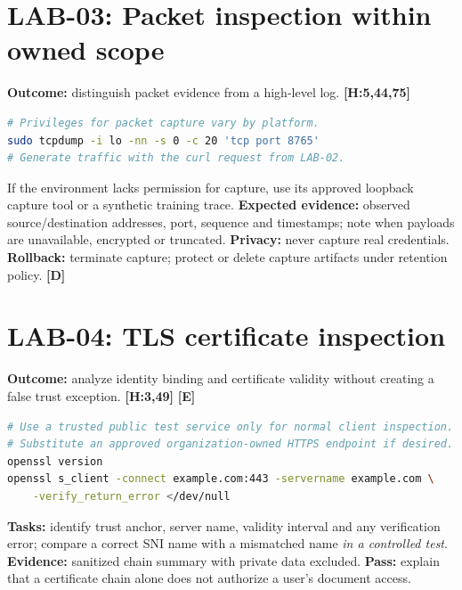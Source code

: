 \documentclass[10pt,letterpaper,oneside]{article}
\newcommand{\handbookref}[1]{\textsf{\color{accent}\textbf{[H:#1]}}}
\newcommand{\modernext}{\textsf{\color{muted}\textbf{[E]}}}
\newcommand{\designed}{\textsf{\color{accent}\textbf{[D]}}}
\begin{document}
\section{LAB-03: Packet inspection within owned scope}
\textbf{Outcome:} distinguish packet evidence from a high-level log. \handbookref{5,44,75}
\begin{lstlisting}[language=bash,caption={Optional local-only capture}]
# Privileges for packet capture vary by platform.
sudo tcpdump -i lo -nn -s 0 -c 20 'tcp port 8765'
# Generate traffic with the curl request from LAB-02.
\end{lstlisting}
If the environment lacks permission for capture, use its approved loopback capture tool or a synthetic training trace. \textbf{Expected evidence:} observed source/destination addresses, port, sequence and timestamps; note when payloads are unavailable, encrypted or truncated. \textbf{Privacy:} never capture real credentials. \textbf{Rollback:} terminate capture; protect or delete capture artifacts under retention policy. \designed{}

\section{LAB-04: TLS certificate inspection}
\textbf{Outcome:} analyze identity binding and certificate validity without creating a false trust exception. \handbookref{3,49} \modernext{}
\begin{lstlisting}[language=bash,caption={Local trust-store-backed TLS test}]
# Use a trusted public test service only for normal client inspection.
# Substitute an approved organization-owned HTTPS endpoint if desired.
openssl version
openssl s_client -connect example.com:443 -servername example.com \
    -verify_return_error </dev/null
\end{lstlisting}
\textbf{Tasks:} identify trust anchor, server name, validity interval and any verification error; compare a correct SNI name with a mismatched name \emph{in a controlled test}. \textbf{Evidence:} sanitized chain summary with private data excluded. \textbf{Pass:} explain that a certificate chain alone does not authorize a user's document access.
\end{document}
